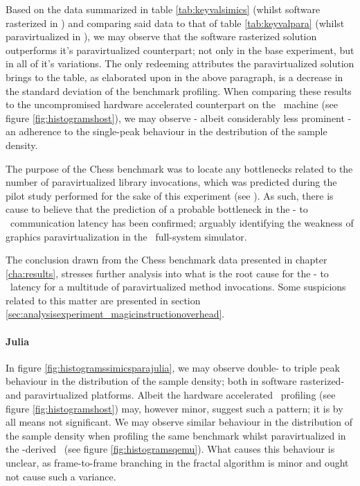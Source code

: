 Based on the data summarized in table \ref{tab:keyvalsimics} (whilst software rasterized in \dvttermsimics ) and comparing said data to that of table \ref{tab:keyvalpara} (whilst paravirtualized in \dvttermsimics ), we may observe that the software rasterized solution outperforms it's paravirtualized counterpart; not only in the base experiment, but in all of it's variations.
The only redeeming attributes the paravirtualized solution brings to the table, as elaborated upon in the above paragraph, is a decrease in the standard deviation of the benchmark profiling.
When comparing these results to the uncompromised hardware accelerated counterpart on the \dvttermhost\ machine (see figure \ref{fig:histogramshost}), we may observe - albeit considerably less prominent - an adherence to the single-peak behaviour in the destribution of the sample density.

The purpose of the Chess benchmark was to locate any bottlenecks related to the number of paravirtualized library invocations, which was predicted during the pilot study performed for the sake of this experiment (see ).
As such, there is cause to believe that the prediction of a probable bottleneck in the \dvttermtarget - to \dvttermhost\ communication latency has been confirmed; arguably identifying the weakness of graphics paravirtualization in the \dvttermsimics\ full-system simulator.

The conclusion drawn from the Chess benchmark data presented in chapter \ref{cha:results}, stresses further analysis into what is the root cause for the \dvttermtarget - to \dvttermhost\ latency for a multitude of paravirtualized method invocations.
Some suspicions related to this matter are presented in section \ref{sec:analysisexperiment_magicinstructionoverhead}. 


\paragraph{Julia}
\label{par:analysisexperiment_julia}
In figure \ref{fig:histogramssimicsparajulia}, we may observe double- to triple peak behaviour in the distribution of the sample density; both in software rasterized- and paravirtualized platforms.
Albeit the hardware accelerated \dvttermhost\ profiling (see figure \ref{fig:histogramshost}) may, however minor, suggest such a pattern; it is by all means not significant.
We may observe similar behaviour in the distribution of the sample density when profiling the same benchmark whilst paravirtualized in the \dvttermqemu -derived \dvttermandroidemulator\ (see figure \ref{fig:histogramsqemu}).
What causes this behaviour is unclear, as frame-to-frame branching in the fractal algorithm is minor and ought not cause such a variance.

